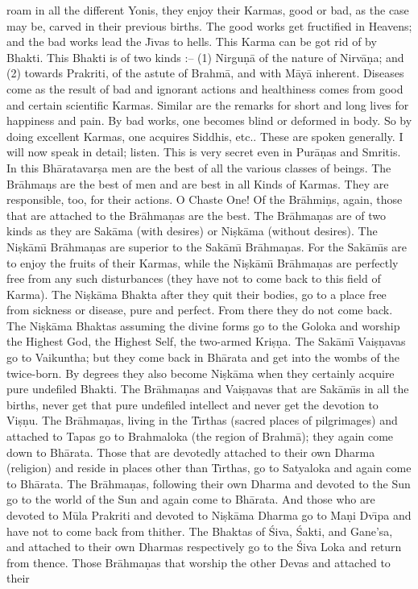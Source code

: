 roam in all the different Yonis, they enjoy their Karmas, good or bad, as the case may be, carved in their previous births. The good works get fructified in Heavens; and the bad works lead the J\={\i}vas to hells. This Karma can be got rid of by Bhakti. This Bhakti is of two kinds :-- (1) Nirgu\d{n}\=a of the nature of Nirv\=a\d{n}a; and (2) towards Prakriti, of the astute of Brahm\=a, and with M\=ay\=a inherent. Diseases come as the result of bad and ignorant actions and healthiness comes from good and certain scientific Karmas. Similar are the remarks for short and long lives for happiness and pain. By bad works, one becomes blind or deformed in body. So by doing excellent Karmas, one acquires Siddhis, etc.. These are spoken generally. I will now speak in detail; listen. This is very secret even in Pur\=a\d{n}as and Smritis. In this Bh\=aratavar\d{s}a men are the best of all the various classes of beings. The Br\=ahma\d{n}s are the best of men and are best in all Kinds of Karmas. They are responsible, too, for their actions. O Chaste One! Of the Br\=ahmi\d{n}s, again, those that are attached to the Br\=ahma\d{n}as are the best. The Br\=ahma\d{n}as are of two kinds as they are Sak\=ama (with desires) or Ni\d{s}k\=ama (without desires). The Ni\d{s}k\=am\={\i} Br\=ahma\d{n}as are superior to the Sak\=am\={\i} Br\=ahma\d{n}as. For the Sak\=am\={\i}s are to enjoy the fruits of their Karmas, while the Ni\d{s}k\=am\={\i} Br\=ahma\d{n}as are perfectly free from any such disturbances (they have not to come back to this field of Karma). The Ni\d{s}k\=ama Bhakta after they quit their bodies, go to a place free from sickness or disease, pure and perfect. From there they do not come back. The Ni\d{s}k\=ama Bhaktas assuming the divine forms go to the Goloka and worship the Highest God, the Highest Self, the two-armed Kri\d{s}\d{n}a. The Sak\=am\={\i} Vai\d{s}\d{n}avas go to Vaikuntha; but they come back in Bh\=arata and get into the wombs of the twice-born. By degrees they also become Ni\d{s}k\=ama when they certainly acquire pure undefiled Bhakti. The Br\=ahma\d{n}as and Vai\d{s}\d{n}avas that are Sak\=am\={\i}s in all the births, never get that pure undefiled intellect and never get the devotion to Vi\d{s}\d{n}u. The Br\=ahma\d{n}as, living in the T\={\i}rthas (sacred places of pilgrimages) and attached to Tapas go to Brahmaloka (the region of Brahm\=a); they again come down to Bh\=arata. Those that are devotedly attached to their own Dharma (religion) and reside in places other than T\={\i}rthas, go to Satyaloka and again come to Bh\=arata. The Br\=ahma\d{n}as, following their own Dharma and devoted to the Sun go to the world of the Sun and again come to Bh\=arata. And those who are devoted to M\=ula Prakriti and devoted to Ni\d{s}k\=ama Dharma go to Ma\d{n}i Dv\={\i}pa and have not to come back from thither. The Bhaktas of \'Siva, \'Sakti, and Gane'sa, and attached to their own Dharmas respectively go to the \'Siva Loka and return from thence. Those Br\=ahma\d{n}as that worship the other Devas and attached to their

